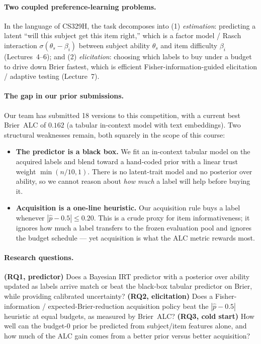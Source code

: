 \documentclass{article}
\begin{document}
\paragraph{Two coupled preference-learning problems.} In the language of
CS329H, the task decomposes into (1) \emph{estimation}: predicting a latent
``will this subject get this item right,'' which is a factor model /
Rasch interaction $\sigma(\theta_s - \beta_i)$ between subject ability $\theta_s$
and item difficulty $\beta_i$ (Lectures~4--6); and (2) \emph{elicitation}:
choosing which labels to buy under a budget to drive down Brier fastest, which
is efficient Fisher-information-guided elicitation / adaptive testing
(Lecture~7).

\paragraph{The gap in our prior submissions.} Our team has submitted 18 versions
to this competition, with a current best Brier~ALC of $0.162$ (a tabular
in-context model with text embeddings). Two structural weaknesses remain, both
squarely in the scope of this course:
\begin{itemize}
  \item \textbf{The predictor is a black box.} We fit an in-context tabular
  model on the acquired labels and blend toward a hand-coded prior with a linear
  trust weight $\min(n/10, 1)$. There is no latent-trait model and no posterior
  over ability, so we cannot reason about \emph{how much} a label will help
  before buying it.
  \item \textbf{Acquisition is a one-line heuristic.} Our acquisition rule buys a
  label whenever $|\hat p - 0.5| \le 0.20$. This is a crude proxy for item
  informativeness; it ignores how much a label transfers to the frozen
  evaluation pool and ignores the budget schedule --- yet acquisition is what
  the ALC metric rewards most.
\end{itemize}

\paragraph{Research questions.}
\textbf{(RQ1, predictor)} Does a Bayesian IRT predictor with a posterior over
ability updated as labels arrive match or beat the black-box tabular predictor
on Brier, while providing calibrated uncertainty?
\textbf{(RQ2, elicitation)} Does a Fisher-information / expected-Brier-reduction
acquisition policy beat the $|\hat p - 0.5|$ heuristic at equal budgets, as
measured by Brier~ALC?
\textbf{(RQ3, cold start)} How well can the budget-0 prior be predicted from
subject/item features alone, and how much of the ALC gain comes from a better
prior versus better acquisition?
\end{document}
